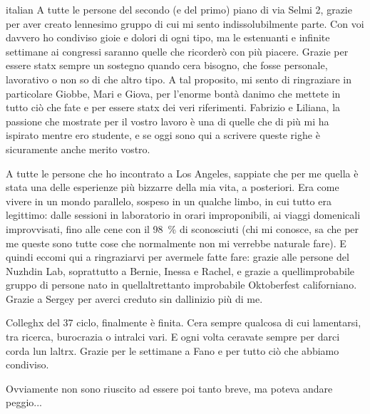 \begin{otherlanguage*}{italian}
A tutte le persone del secondo (e del primo) piano di via Selmi 2, grazie per aver creato l\curlyapostrophe{}ennesimo gruppo di cui mi sento indissolubilmente parte. Con voi davvero ho condiviso gioie e dolori di ogni tipo, ma le estenuanti e infinite settimane ai congressi saranno quelle che ricorderò con più piacere. Grazie per essere statx sempre un sostegno quando c\curlyapostrophe{}era bisogno, che fosse personale, lavorativo o non so di che altro tipo. A tal proposito, mi sento di ringraziare in particolare Giobbe, Mari e Giova, per l'enorme bontà d\curlyapostrophe{}animo che mettete in tutto ciò che fate e per essere statx dei veri riferimenti. Fabrizio e Liliana, la passione che mostrate per il vostro lavoro è una di quelle che di più mi ha ispirato mentre ero studente, e se oggi sono qui a scrivere queste righe è sicuramente anche merito vostro. 

A tutte le persone che ho incontrato a Los Angeles, sappiate che per me quella è stata una delle esperienze più bizzarre della mia vita, a posteriori. Era come vivere in un mondo parallelo, sospeso in un qualche limbo, in cui tutto era legittimo: dalle sessioni in laboratorio in orari improponibili, ai viaggi domenicali improvvisati, fino alle cene con il \qty{98}{\percent} di sconosciuti (chi mi conosce, sa che per me queste sono tutte cose che normalmente non mi verrebbe naturale fare). E quindi eccomi qui a ringraziarvi per avermele fatte fare: grazie alle persone del Nuzhdin Lab, soprattutto a Bernie, Inessa e Rachel, e grazie a quell\curlyapostrophe{}improbabile gruppo di persone nato in quell\curlyapostrophe{}altrettanto improbabile Oktoberfest californiano. Grazie a Sergey per averci creduto sin dall\curlyapostrophe{}inizio più di me.

Colleghx del 37\textdegree{} ciclo, finalmente è finita. C\curlyapostrophe{}era sempre qualcosa di cui lamentarsi, tra ricerca, burocrazia o intralci vari. E ogni volta c\curlyapostrophe{}eravate sempre per darci corda l\curlyapostrophe{}un l\curlyapostrophe{}altrx. Grazie per le settimane a Fano e per tutto ciò che abbiamo condiviso.

Ovviamente non sono riuscito ad essere poi tanto breve, ma poteva andare peggio...
\end{otherlanguage*}